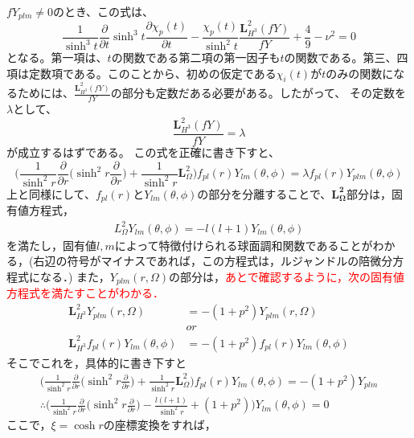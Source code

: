  $fY_{plm}\neq0$のとき、この式は、
 \begin{equation}
    \frac{1}{\sinh^3t}\frac{\partial}{\partial t}\sinh^3t\frac{\partial\chi_p(t)}{\partial t}-\frac{\chi_p(t)}{\sinh^2t}\frac{\bm{L}^2_{H^3}(fY)}{fY}+\frac{4}{9}-\nu^2=0
 \end{equation}
 となる。第一項は、$t$の関数である第二項の第一因子も$t$の関数である。第三、四項は定数項である。このことから、初めの仮定である$\chi_i(t)$が$t$のみの関数になるためには、$\frac{\bm{L}^2_{H^3}(fY)}{fY}$の部分も定数だある必要がある。したがって、
 その定数を$\lambda$として、
 \begin{equation}
   \frac{\bm{L}^2_{H^3}(fY)}{fY}=\lambda
 \end{equation}
 が成立するはずである。
 この式を正確に書き下すと、
 \begin{equation}
   \biggl(\frac{1}{\sinh^2r}\frac{\partial}{\partial r}\biggl(\sinh^2r\frac{\partial}{\partial r}\biggr)+\frac{1}{\sinh^2r}\bm{L}_{\Omega}^2\biggr)f_{pl}(r)Y_{lm}(\theta,\phi)=\lambda f_{pl}(r)Y_{plm}(\theta,\phi)
 \end{equation}
 上と同様にして、$f_{pl}(r)$と$Y_{lm}(\theta,\phi)$の部分を分離することで、$\bm{L_{\Omega}^2}$部分は，固有値方程式，
\begin{align}
  L_{\Omega}^2Y_{lm}(\theta,\phi)=-l(l+1)Y_{lm}(\theta,\phi)
\end{align}
を満たし，固有値$l,m$によって特徴付けられる球面調和関数であることがわかる，(右辺の符号がマイナスであれば，この方程式は，ルジャンドルの陪微分方程式になる．)
また，$Y_{plm}(r,\Omega)$の部分は，\textcolor{red}{あとで確認するように，次の固有値方程式を満たすことがわかる．}
\begin{align}
  \bm{L}_{H^3}^2Y_{plm}(r,\Omega)&=-(1+p^2)Y_{plm}(r,\Omega) \\
  &or \\
 \bm{L}_{H^3}^2f_{pl}(r)Y_{lm}(\theta,\phi)&=-(1+p^2)f_{pl}(r)Y_{lm}(\theta,\phi)
\end{align}
そこでこれを，具体的に書き下すと
\begin{align}
\biggl(\frac{1}{\sinh^2r}\frac{\partial}{\partial r}\biggl(\sinh^2r\frac{\partial}{\partial r}\biggr)+\frac{1}{\sinh^2r}\bm{L}_{\Omega}^2\biggr)f_{pl}(r)Y_{lm}(\theta,\phi)=-(1+p^2)Y_{plm} \\
\label{1.80}
\therefore\biggl(\frac{1}{\sinh^2r}\frac{\partial}{\partial r}\biggl(\sinh^2r\frac{\partial}{\partial r}\biggr)-\frac{l(l+1)}{\sinh^2r}+(1+p^2)\biggr)Y_{lm}(\theta,\phi)=0
\end{align}
ここで，$\xi=\cosh r$の座標変換をすれば，
